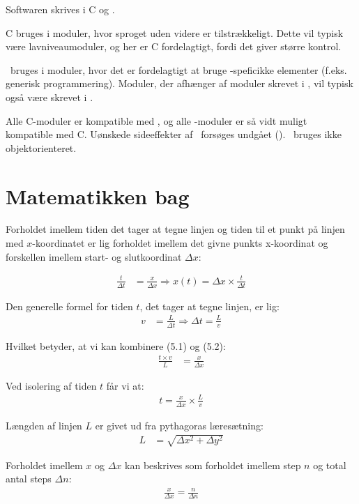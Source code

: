 Softwaren skrives i C og \Cpp.

C bruges i moduler, hvor sproget uden videre er tilstrækkeligt. Dette
vil typisk være lavniveaumoduler, og her er C fordelagtigt, fordi det
giver større kontrol.

\Cpp\ bruges i moduler, hvor det er fordelagtigt at bruge
\Cpp-speficikke elementer (f.eks. generisk programmering). Moduler, der afhænger af moduler skrevet i \Cpp, vil
typisk også være skrevet i \Cpp.

Alle C-moduler er kompatible med \Cpp, og alle \Cpp-moduler er så vidt
muligt kompatible med C. Uønskede sideeffekter af \Cpp\ forsøges
undgået (). \Cpp\ bruges ikke objektorienteret.

\section{Matematikken bag}

Forholdet imellem tiden det tager at tegne linjen og tiden til et
punkt på linjen med $x$-koordinatet er lig forholdet imellem det givne
punkts x-koordinat og forskellen imellem start- og slutkoordinat $\Delta x$:

\begin{align}
\frac{t}{\Delta t} &= \frac{x}{\Delta x} \Rightarrow x(t) = \Delta x \times \frac{t}{\Delta t}
\end{align}

Den generelle formel for tiden $t$, det tager at tegne linjen, er lig:
\begin{align}
v &= \frac{L}{\Delta t} \Rightarrow \Delta t= \frac{L}{v}
\end{align}

Hvilket betyder, at vi kan kombinere (5.1) og (5.2):
\begin{align*}
\frac{t \times v}{L} &= \frac{x}{\Delta x}
\end{align*}

Ved isolering af tiden $t$ får vi at:
\begin{align}
t = \frac{x}{\Delta x} \times \frac{L}{v}
\end{align}

Længden af linjen $L$ er givet ud fra pythagoras læresætning:
\begin{align*}
L &= \sqrt{\Delta x^2+\Delta y^2}
\end{align*}

Forholdet imellem $x$ og $\Delta x$ kan beskrives som forholdet imellem step $n$ og total antal steps $\Delta n$:
\begin{align}
\frac{x}{\Delta x} = \frac{n}{\Delta n}
\end{align}

